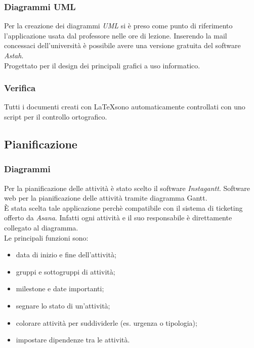 \documentclass[12pt,a4paper,titlepage]{article}
\begin{document}
\subsubsection{Diagrammi UML}
Per la creazione dei diagrammi \textit{UML} si è preso come punto di riferimento l'applicazione usata dal professore nelle ore di lezione. Inserendo la mail concessaci dell'università è possibile avere una versione gratuita del software \textit{Astah}.\\
Progettato per il design dei principali grafici a uso informatico.
\subsubsection{Verifica}
Tutti i documenti creati con \LaTeX sono automaticamente controllati con uno script per il controllo ortografico.
\subsection{Pianificazione}
\subsubsection{Diagrammi}
Per la pianificazione delle attività è stato scelto il software \textit{Instagantt}. Software web per la pianificazione delle attività tramite diagramma Gantt. \\
È stata scelta tale applicazione perchè compatibile con il sistema di ticketing offerto da \textit{Asana}. Infatti ogni attività e il suo responsabile è direttamente collegato al diagramma. \\
Le principali funzioni sono:
\begin{itemize}
	\item data di inizio e fine dell'attività;
	\item gruppi e sottogruppi di attività;
	\item milestone e date importanti;
	\item segnare lo stato di un'attività;
	\item colorare attività per suddividerle (es. urgenza o tipologia);
	\item impostare dipendenze tra le attività.
\end{itemize}
\end{document}
